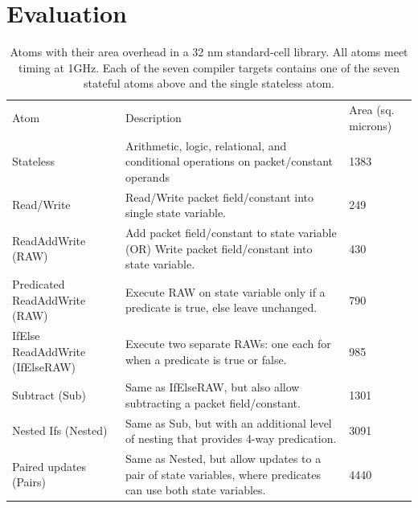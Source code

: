 \section{Evaluation}


\label{s:eval}

\begin{table}[!t]
  \begin{scriptsize}
  \begin{tabular}{|p{}|p{}|p{}|}
    \hline
    Atom & Description & Area (sq. microns)\\
    Stateless & Arithmetic, logic, relational, and conditional operations on packet/constant operands & 1383 \\
    \hline
    Read/Write & Read/Write packet field/constant into single state variable. & 249 \\
    \hline
    ReadAddWrite (RAW) & Add packet field/constant to state variable (OR) Write packet field/constant into state variable. & 430 \\
    \hline
    Predicated ReadAddWrite (RAW) & Execute RAW on state variable only if a predicate is true, else leave unchanged. & 790 \\
    \hline
    IfElse ReadAddWrite (IfElseRAW) & Execute two separate RAWs: one each for when a predicate is true or false. & 985 \\
    \hline
    Subtract (Sub) & Same as IfElseRAW, but also allow subtracting a packet field/constant. & 1301 \\
    \hline
    Nested Ifs (Nested) & Same as Sub, but with an additional level of nesting that provides 4-way predication. & 3091 \\
    \hline
    Paired updates (Pairs) & Same as Nested, but allow updates to a pair of state variables, where predicates can use both state variables. & 4440 \\
    \hline
  \end{tabular}
  \end{scriptsize}
  \caption{Atoms with their area overhead in a 32 nm standard-cell library.
  All atoms meet timing at 1GHz. Each of the seven compiler targets contains
  one of the seven stateful atoms above and the single stateless atom.}
  \label{tab:templates}
\end{table}

